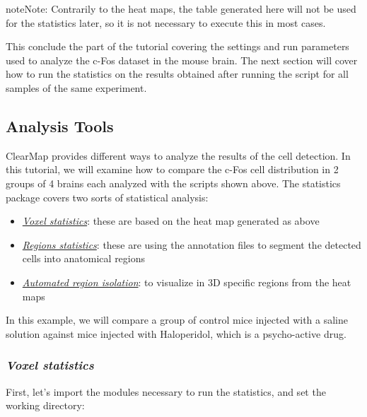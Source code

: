 \documentclass[letterpaper,10pt,english]{sphinxmanual}
\begin{document}
\begin{notice}{note}{Note:}
Contrarily to the heat maps, the table generated here will not be used for the statistics later, so it is not necessary to execute this in most cases.
\end{notice}

This conclude the part of the tutorial covering the settings and run parameters used to analyze the c-Fos dataset in the mouse brain. The next section will cover how to run the statistics on the results obtained after running the  script for all samples of the same experiment.


\subsection{Analysis Tools}
\label{tutorial:analysis-tools}
ClearMap provides different ways to analyze the results of the cell detection. In this tutorial, we will examine how to compare the c-Fos cell distribution in 2 groups of 4 brains each analyzed with the scripts shown above. The statistics package covers two sorts of statistical analysis:
\begin{itemize}
\item {} 
{\hyperref[tutorial:voxel-statistics]{\emph{Voxel statistics}}}: these are based on the heat map generated as above

\item {} 
{\hyperref[tutorial:regions-statistics]{\emph{Regions statistics}}}: these are using the annotation files to segment the detected cells into anatomical regions

\item {} 
{\hyperref[tutorial:automated-region-isolation]{\emph{Automated region isolation}}}: to visualize in 3D specific regions from the heat maps

\end{itemize}

In this example, we will compare a group of control mice injected with a saline solution against mice injected with Haloperidol, which is a psycho-active drug.


\subsubsection{\emph{Voxel statistics}}
\label{tutorial:voxel-statistics}
First, let's import the modules necessary to run the statistics, and set the working directory:
\end{document}

